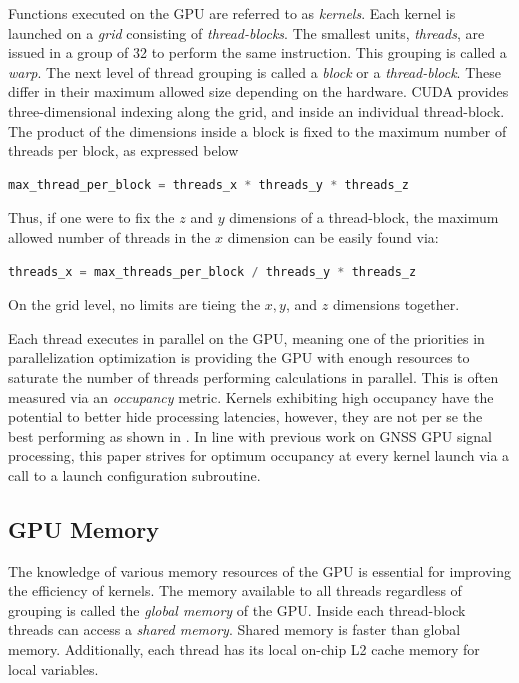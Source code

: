\documentclass{juliacon}
\begin{document}
Functions executed on the GPU are referred to as \emph{kernels}. Each kernel is launched on a \emph{grid} consisting of \emph{thread-blocks}. The smallest units, \emph{threads}, are issued in a group of 32 to perform the same instruction. This grouping is called a \emph{warp}. The next level of thread grouping is called a \emph{block} or a \emph{thread-block}. These differ in their maximum allowed size depending on the hardware. CUDA provides three-dimensional indexing along the grid, and inside an individual thread-block. The product of the dimensions inside a block is fixed to the maximum number of threads per block, as expressed below
\begin{lstlisting}[language = Julia]
max_thread_per_block = threads_x * threads_y * threads_z
\end{lstlisting}
Thus, if one were to fix the $z$ and $y$ dimensions of a thread-block, the maximum allowed number of threads in the $x$ dimension can be easily found via:
\begin{lstlisting}[language = Julia]
threads_x = max_threads_per_block / threads_y * threads_z
\end{lstlisting}
On the grid level, no limits are tieing the $x, y$, and $z$ dimensions together.

Each thread executes in parallel on the GPU, meaning one of the priorities in parallelization optimization is providing the GPU with enough resources to saturate the number of threads performing calculations in parallel. This is often measured via an \emph{occupancy} metric. Kernels exhibiting high occupancy have the potential to better hide processing latencies, however, they are not per se the best performing as shown in \cite{Volkov2010}. In line with previous work on GNSS GPU signal processing, this paper strives for optimum occupancy at every kernel launch via a call to a launch configuration subroutine.

\subsection*{GPU Memory}
The knowledge of various memory resources of the GPU is essential for improving the efficiency of kernels. The memory available to all threads regardless of grouping is called the \emph{global memory} of the GPU. Inside each thread-block threads can access a \emph{shared memory}. Shared memory is faster than global memory. Additionally, each thread has its local on-chip L2 cache memory for local variables. 
\end{document}

